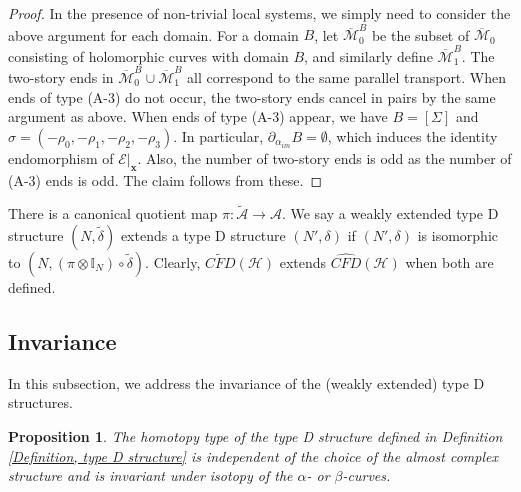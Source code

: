 \documentclass{amsart}
\newtheorem{prop}[thm]{Proposition}
\theoremstyle{definition}
\theoremstyle{remark}
\numberwithin{equation}{section}
\numberwithin{equation}{section} \makeatletter
\begin{document}
\begin{proof}
In the presence of non-trivial local systems, we simply need to consider the above argument for each domain. For a domain $B$, let $\overline{\mathcal{M}}_0^B$ be the subset of $\overline{\mathcal{M}}_0$ consisting of holomorphic curves with domain $B$, and similarly define $\overline{\mathcal{M}}_1^B$. The two-story ends in $\overline{\mathcal{M}}_0^B\cup \overline{\mathcal{M}}_1^B$ all correspond to the same parallel transport. When ends of type (A-3) do not occur, the two-story ends cancel in pairs by the same argument as above. When ends of type (A-3) appear, we have $B=[\Sigma]$ and $\sigma=(-\rho_0,-\rho_1,-\rho_2,-\rho_3)$. In particular, $\partial_{\alpha_{im}}B=\emptyset$, which induces the identity endomorphism of $\mathcal{E}|_{\bm{x}}$. Also, the number of two-story ends is odd as the number of (A-3) ends is odd. The claim follows from these. 
\end{proof}

There is a canonical quotient map $\pi:\tilde{\mathcal{A}}\rightarrow \mathcal{A}$. We say a weakly extended type D structure $(N,\tilde{\delta})$ extends a type D structure $(N',\delta)$ if $(N',\delta)$ is isomorphic to $(N,(\pi\otimes \mathbb{I}_N)\circ \tilde{\delta})$. Clearly, $\widetilde{CFD}(\mathcal{H})$ extends $\widehat{CFD}(\mathcal{H})$ when both are defined.

\subsection{Invariance}
In this subsection, we address the invariance of the (weakly extended) type D structures. 

\begin{prop}\label{Proposition, invariance of type D structure}
The homotopy type of the type D structure defined in Definition \ref{Definition, type D structure} is independent of the choice of the almost complex structure and is invariant under isotopy of the $\alpha$- or $\beta$-curves. 
\end{prop}
\end{document}
